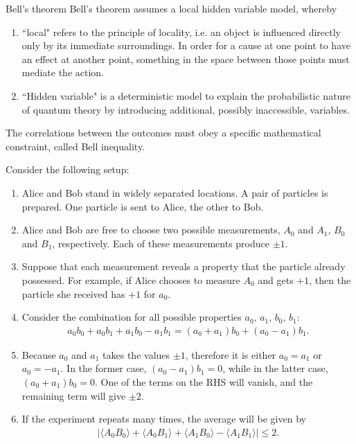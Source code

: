 \documentclass{beamer}
\begin{document}
\begin{frame}{Bell's theorem}
\justify
Bell's theorem assumes a local hidden variable model, whereby
\begin{enumerate}
\item ``local" refers to the principle of locality, i.e. an object is influenced directly only by its immediate surroundings. In order for a cause at one point to have an effect at another point, something in the space between those points must mediate the action.
\item ``Hidden variable" is a deterministic model to explain the probabilistic nature of quantum theory by introducing additional, possibly inaccessible, variables.
\end{enumerate}
\vfill
The correlations between the outcomes must obey a specific mathematical constraint, called Bell inequality.
\end{frame}

\begin{frame}
\justify
Consider the following setup:
\begin{enumerate}
\item Alice and Bob stand in widely separated locations. A pair of particles is prepared. One particle is sent to Alice, the other to Bob.
\item Alice and Bob are free to choose two possible measurements, $A_0$ and $A_1$, $B_0$ and $B_1$, respectively. Each of these measurements produce $\pm 1$.
\item Suppose that each measurement reveals a property that the particle already possessed. For example, if Alice chooses to measure $A_0$ and gets $+1$, then the particle she received has $+1$ for $a_0$.
\item Consider the combination for all possible properties $a_0,\, a_1,\, b_0,\, b_1$:
\begin{align}
a_0 b_0 + a_0 b_1 + a_1 b_0 - a_1 b_1 = (a_0 + a_1)b_0 + (a_0 - a_1)b_1.
\end{align}
\item Because $a_0$ and $a_1$ takes the values $\pm 1$, therefore it is either $a_0 = a_1$ or $a_0 = -a_1$. In the former case, $(a_0 - a_1)b_1 = 0$, while in the latter case, $(a_0 + a_1)b_0 = 0$. One of the terms on the RHS will vanish, and the remaining term will give $\pm 2$.
\item If the experiment repeats many times, the average will be given by
\begin{align}
|\langle A_0 B_0 \rangle + \langle A_0 B_1 \rangle + \langle A_1 B_0 \rangle - \langle A_1 B_1 \rangle| \leq 2.
\end{align}
\end{enumerate}
\end{frame}
\end{document}
